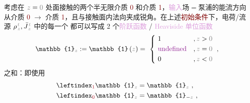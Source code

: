 考虑在 $\mathcolor{gray}{z} = \mathcolor{gray}{0}$ 处面接触的两个半无限介质 \textcolor{Maroon}{0} 和介质 \textcolor{Maroon}{1}，\textcolor{Plum}{输入}场$=$\textcolor{NavyBlue}{泵浦}的能流方向从介质 \textcolor{Maroon}{0} $\to$ 介质 \textcolor{Maroon}{1}，且与接触面内法向夹成锐角。在上述\textcolor{Maroon}{初始条件}下，电荷/流源 ${\rho}^{\;\!\mathcolor{gray}{t}}_{\;\!\mathcolor{gray}{z}}, \bar{J}^{\;\!\mathcolor{gray}{t}}_{\;\!\mathcolor{gray}{z}}$ 中的每一个 都可以写成 2 个\textcolor{Plum}{阶跃函数} / \textcolor{Plum}{Heaviside 单位函数}
\abovedisplayskip=8pt
\belowdisplayskip=10pt
\begin{align} \label{eq:u}
	\mathbb{1}_{\mathcolor{gray}{z}} := \mathbb{1} \left( \mathcolor{gray}{z} \right) = ~\left\{~ \begin{aligned} 
		&1 &&, \mathcolor{gray}{z \mathcolor{black}{>} 0} \\ 
		&\textcolor{Plum}{\text{undefined}} &&, \mathcolor{gray}{z \mathcolor{black}{=} 0} \\
		&0 &&, \mathcolor{gray}{z \mathcolor{black}{<} 0} \end{aligned}\right. ~,
\end{align}
之和：即使用
\begin{subequations} \label{eq:u-01}
	\abovedisplayskip=0pt
	\belowdisplayskip=8pt
\begin{align}
	\leftindex_{\textcolor{Maroon}{1}} {\mathbb{1}}_{\mathcolor{gray}{z}} &= {\mathbb{1}}_{\mathcolor{gray}{z}} ~, \label{eq:u-1} \\ 
	\leftindex_{\textcolor{Maroon}{0}} {\mathbb{1}}_{\mathcolor{gray}{z}} &= {\mathbb{1}}_{ - \mathcolor{gray}{z} } ~, \label{eq:u-0}
\end{align}
\end{subequations}
